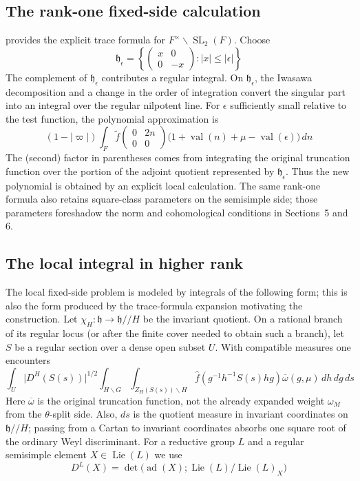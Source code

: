 \documentclass[11pt]{amsart}
\theoremstyle{definition}
\theoremstyle{remark}
\newcommand{\Lie}{\operatorname{Lie}}
\newcommand{\ad}{\operatorname{ad}}
\newcommand{\SL}{\operatorname{SL}}
\newcommand{\val}{\operatorname{val}}
\newcommand{\abs}[1]{\lvert #1\rvert}
\newcommand{\h}{\mathfrak h}
\begin{document}
\subsection{The rank-one fixed-side calculation}
\cite{SparlingRankOne} provides the explicit trace formula for $F^\times\backslash\SL_2(F)$. Choose
\[
 \h_\epsilon=\left\{
 \begin{pmatrix}x&0\\0&-x\end{pmatrix}:|x|\leq|\epsilon|
 \right\}
\]
The complement of $\h_\epsilon$ contributes a regular integral.  On
$\h_\epsilon$, the Iwasawa decomposition and a change in the order of
integration convert the singular part into an integral over the regular
nilpotent line.  For $\epsilon$ sufficiently small relative to the test
function, the polynomial approximation is
\begin{equation}\label{eq:rank-one-fixed-term}
 (1-|\varpi|)\int_F
 \widetilde f
 \begin{pmatrix}0&2n\\0&0\end{pmatrix}
 \bigl(1+\val(n)+\mu-\val(\epsilon)\bigr)\,dn
\end{equation}
The (second) factor in parentheses comes from integrating the original truncation function
over the portion of the adjoint quotient represented by $\h_\epsilon$.  Thus the new polynomial is obtained by
an explicit local calculation.  The same rank-one formula also retains square-class
parameters on the semisimple side; those parameters foreshadow the norm and
cohomological conditions in Sections~5 and 6.

\subsection{The local integral in higher rank}
The local fixed-side problem is modeled by integrals of the
following form; this is also the form produced by the trace-formula expansion motivating the construction.  Let $\chi_H:\h\to\h/\!/H$ be the invariant quotient.  On a rational
branch of its regular locus (or after the finite cover needed to obtain such a
branch), let $S$ be a regular section over a dense open subset $U$.  With compatible
measures one encounters
\begin{equation}\label{eq:weighted-weyl}
 \int_U\abs{D^H(S(s))}^{1/2}
   \int_{H\backslash G}\int_{Z_H(S(s))\backslash H}
   \widehat f(g^{-1}h^{-1}S(s)hg)
   \overline\omega(g,\mu)\,dh\,dg\,ds
\end{equation}
Here
$\overline\omega$ is the original truncation function, not the already
expanded weight $\omega_M$ from the $\theta$-split side.  Also, $ds$ is the
quotient measure in invariant coordinates on $\h/\!/H$; passing from a Cartan
to invariant coordinates absorbs one square root of the ordinary Weyl
discriminant.  For a reductive group $L$ and a regular semisimple element
$X\in\Lie(L)$ we use
\[
 D^L(X)=\det\bigl(\ad(X);\Lie(L)/\Lie(L)_X\bigr)
\]
\end{document}
